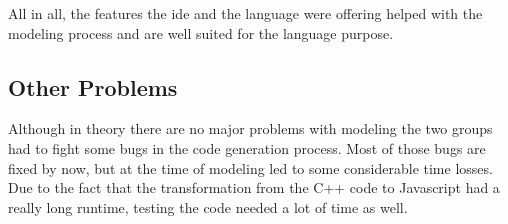 All in all, the features the ide and the language were offering helped with the modeling process and are well suited for the language purpose.

\subsection{Other Problems}
Although in theory there are no major problems with modeling the two groups had to fight some bugs in the code generation process. Most of those bugs are fixed by now, but at the time of modeling led to some considerable time losses. Due to the fact that the transformation from the C++ code to Javascript had a really long runtime, testing the code needed a lot of time as well.



